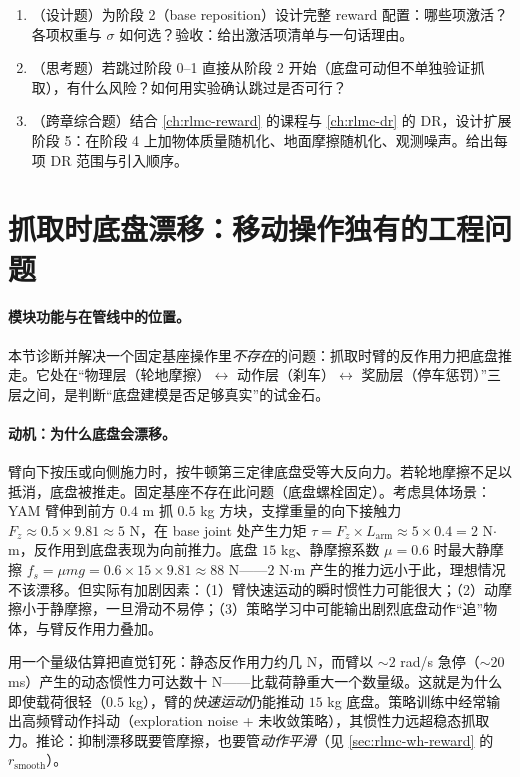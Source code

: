 \begin{practice}[课程设计]
\begin{enumerate}
\item （设计题）为阶段 2（base reposition）设计完整 reward 配置：哪些项激活？各项权重与 $\sigma$ 如何选？验收：给出激活项清单与一句话理由。
\item （思考题）若跳过阶段 0--1 直接从阶段 2 开始（底盘可动但不单独验证抓取），有什么风险？如何用实验确认跳过是否可行？
\item （跨章综合题）结合 \cref{ch:rlmc-reward} 的课程与 \cref{ch:rlmc-dr} 的 DR，设计扩展阶段 5：在阶段 4 上加物体质量随机化、地面摩擦随机化、观测噪声。给出每项 DR 范围与引入顺序。
\end{enumerate}
\end{practice}

\section{抓取时底盘漂移：移动操作独有的工程问题}
\label{sec:rlmc-wh-drift}

\paragraph{模块功能与在管线中的位置。}本节诊断并解决一个固定基座操作里\emph{不存在}的问题：抓取时臂的反作用力把底盘推走。它处在“物理层（轮地摩擦）$\leftrightarrow$ 动作层（刹车）$\leftrightarrow$ 奖励层（停车惩罚）”三层之间，是判断“底盘建模是否足够真实”的试金石。

\paragraph{动机：为什么底盘会漂移。}臂向下按压或向侧施力时，按牛顿第三定律底盘受等大反向力。若轮地摩擦不足以抵消，底盘被推走。固定基座不存在此问题（底盘螺栓固定）。考虑具体场景：YAM 臂伸到前方 $0.4$ m 抓 $0.5$ kg 方块，支撑重量的向下接触力 $F_z\approx0.5\times9.81\approx5$ N，在 base joint 处产生力矩 $\tau=F_z\times L_{\text{arm}}\approx5\times0.4=2$ N$\cdot$m，反作用到底盘表现为向前推力。底盘 $15$ kg、静摩擦系数 $\mu=0.6$ 时最大静摩擦 $f_s=\mu m g=0.6\times15\times9.81\approx88$ N——$2$ N$\cdot$m 产生的推力远小于此，理想情况不该漂移。但实际有加剧因素：（1）臂快速运动的瞬时惯性力可能很大；（2）动摩擦小于静摩擦，一旦滑动不易停；（3）策略学习中可能输出剧烈底盘动作“追”物体，与臂反作用力叠加。

\begin{insight}\label{ins:rlmc-wh-drift-cause}
用一个量级估算把直觉钉死：静态反作用力约几 N，而臂以 $\sim 2$ rad/s 急停（$\sim 20$ ms）产生的动态惯性力可达数十 N——比载荷静重大一个数量级。这就是为什么即使载荷很轻（$0.5$ kg），臂的\emph{快速运动}仍能推动 $15$ kg 底盘。策略训练中经常输出高频臂动作抖动（exploration noise + 未收敛策略），其惯性力远超稳态抓取力。推论：抑制漂移既要管摩擦，也要管\emph{动作平滑}（见 \cref{sec:rlmc-wh-reward} 的 $r_{\text{smooth}}$）。
\end{insight}


